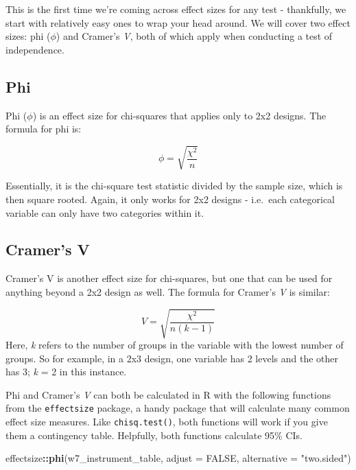 \documentclass[
]{book}
\newenvironment{Shaded}{\begin{snugshade}}{\end{snugshade}}
\newcommand{\AttributeTok}[1]{\textcolor[rgb]{0.13,0.29,0.53}{#1}}
\newcommand{\ConstantTok}[1]{\textcolor[rgb]{0.56,0.35,0.01}{#1}}
\newcommand{\FunctionTok}[1]{\textcolor[rgb]{0.13,0.29,0.53}{\textbf{#1}}}
\newcommand{\NormalTok}[1]{#1}
\newcommand{\SpecialCharTok}[1]{\textcolor[rgb]{0.81,0.36,0.00}{\textbf{#1}}}
\newcommand{\StringTok}[1]{\textcolor[rgb]{0.31,0.60,0.02}{#1}}
\begin{document}
This is the first time we're coming across effect sizes for any test - thankfully, we start with relatively easy ones to wrap your head around. We will cover two effect sizes: phi (\(\phi\)) and Cramer's \emph{V}, both of which apply when conducting a test of independence.

\hypertarget{phi}{%
\subsection{Phi}\label{phi}}

Phi (\(\phi\)) is an effect size for chi-squares that applies only to 2x2 designs. The formula for phi is:

\[
\phi = \sqrt{\frac{\chi^2}{n}}
\]

Essentially, it is the chi-square test statistic divided by the sample size, which is then square rooted. Again, it only works for 2x2 designs - i.e.~each categorical variable can only have two categories within it.

\hypertarget{cramers-v}{%
\subsection{Cramer's V}\label{cramers-v}}

Cramer's V is another effect size for chi-squares, but one that can be used for anything beyond a 2x2 design as well. The formula for Cramer's \emph{V} is similar:

\[
V = \sqrt{\frac{\chi^2}{n(k-1)}}
\]
Here, \emph{k} refers to the number of groups in the variable with the lowest number of groups. So for example, in a 2x3 design, one variable has 2 levels and the other has 3; \emph{k} = 2 in this instance.

Phi and Cramer's \emph{V} can both be calculated in R with the following functions from the \texttt{effectsize} package, a handy package that will calculate many common effect size measures. Like \texttt{chisq.test()}, both functions will work if you give them a contingency table. Helpfully, both functions calculate 95\% CIs.

\begin{Shaded}
\begin{Highlighting}[]
\NormalTok{effectsize}\SpecialCharTok{::}\FunctionTok{phi}\NormalTok{(w7\_instrument\_table, }\AttributeTok{adjust =} \ConstantTok{FALSE}\NormalTok{, }\AttributeTok{alternative =} \StringTok{"two.sided"}\NormalTok{)}
\end{Highlighting}
\end{Shaded}
\end{document}
